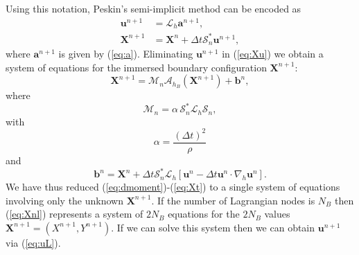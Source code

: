 \documentclass[preprint,12pt]{elsarticle}
\begin{document}
Using this notation,  Peskin's semi-implicit method  can be encoded as
\begin{align}
\mathbf{u}^{n+1} &= \mathcal{L}_h \mathbf{a}^{n+1}, \label{eq:uL} \\
\mathbf{X}^{n+1}&=\mathbf{X}^n +\Delta t\mathcal{S}^*_n\mathbf{u}^{n+1}, \label{eq:Xu}
\end{align}
where $ \mathbf{a}^{n+1}$ is given by (\ref{eq:a}). Eliminating $\mathbf{u}^{n+1}$ in (\ref{eq:Xu}) we obtain  a system of equations for the immersed boundary configuration $\mathbf{X}^{n+1}$:
\begin{equation}
\mathbf{X}^{n+1} = \mathcal{M}_n\mathcal{A}_{h_B} (\mathbf{X}^{n+1}) + \mathbf{b}^n, \label{eq:Xnl}
\end{equation}
where 
\begin{equation}
 \mathcal{M}_n =  \alpha \,  \mathcal{S}^*_n \mathcal{L}_h \mathcal{S}_n,
\end{equation}
with
\begin{equation}
\alpha = \frac{(\Delta t)^2}{\rho}
\end{equation}
and 
\begin{equation}
 \mathbf{b}^n = \mathbf{X}^n + \Delta t \mathcal{S}^*_n \mathcal{L}_h [\mathbf{u}^n-\Delta t \mathbf{u}^n \cdot
 \nabla_h \mathbf{u}^n]. \label{eq:bn}
\end{equation}
We have thus reduced (\ref{eq:dmoment})-(\ref{eq:Xt}) to a single system of  equations involving only the unknown $\mathbf{X}^{n+1}$. If the number of Lagrangian nodes is $N_B$ then (\ref{eq:Xnl}) represents a system of $2N_B$ equations for the 
$2N_B$ values $\mathbf{X}^{n+1}=(X^{n+1},Y^{n+1})$. If we can solve this system then we can obtain $\mathbf{u}^{n+1}$ via (\ref{eq:uL}). 
\end{document}
